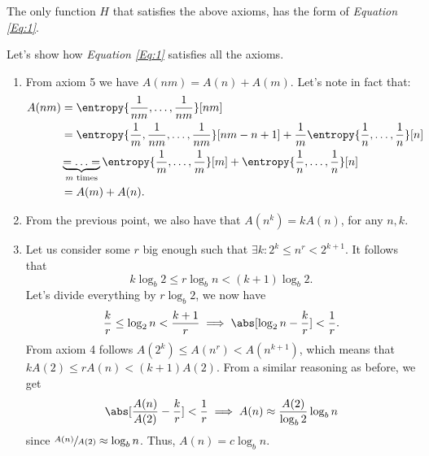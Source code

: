 \documentclass{subfiles}
\begin{document}
    \begin{theorem*}
        The only function \(H\) that satisfies the above axioms,
        has the form of \emph{Equation \eqref{Eq:1}}.
    \end{theorem*}
    \begin{proof*}
        Let's show how \emph{Equation \eqref{Eq:1}} satisfies all the axioms.
        \begin{enumerate}
            \item From axiom 5 we have \(A(nm) = A(n) + A(m)\).
                Let's note in fact that: 
                \[\begin{aligned}
                    A(nm) & = \entropy{\frac{1}{nm}, \ldots, \frac{1}{nm}}[nm] \\ 
                        & = \entropy{
                            \frac{1}{m}, \frac{1}{nm}, \ldots, \frac{1}{nm} 
                        }[nm - n + 1] + \frac{1}{m} \entropy{
                            \frac{1}{n}, \ldots, \frac{1}{n}
                        }[n] \\
                        & \underbrace{ = \ldots = }_{m \text{ times}} \entropy{
                            \frac{1}{m}, \ldots, \frac{1}{m}
                        }[m] + \entropy{\frac{1}{n}, \ldots, \frac{1}{n}}[n] \\ 
                    & = A(m) + A(n).
                \end{aligned}\]
            \item From the previous point, 
                we also have that \(A(n^{k}) = k A(n)\), for any \(n, k\).

            \item Let us consider some \(r\) big enough such that 
                \(\exists k : 2^{k} \le n^{r} < 2^{k + 1}\).
                It follows that 
                \[
                    k \log_{b} 2 \le r \log_{b} n < (k + 1) \log_{b} 2.
                \]
                Let's divide everything by \(r \log_{b} 2\), we now have 
                \[
                    \frac{k}{r} \le \log_{2} n < \frac{k + 1}{r} 
                        \implies \abs[\log_{2} n - \frac{k}{r}] < \frac{1}{r}.
                \]
                From axiom 4 follows \(A(2^{k}) \le A(n^{r}) < A(n^{k + 1})\),
                which means that \(k A(2) \le r A(n) < (k + 1)A(2)\).
                From a similar reasoning as before, we get 
                \[
                    \abs[\frac{A(n)}{A(2)} - \frac{k}{r}] < \frac{1}{r}
                        \implies A(n) \approx \frac{A(2)}{\log_{b} 2} \log_{b} n
                \]
                since \(\sfrac{A(n)}{A(2)} \approx \log_{b} n\).
                Thus, \(A(n) = c \log_{b} n\).


\end{enumerate}
\end{proof*}
\end{document}
